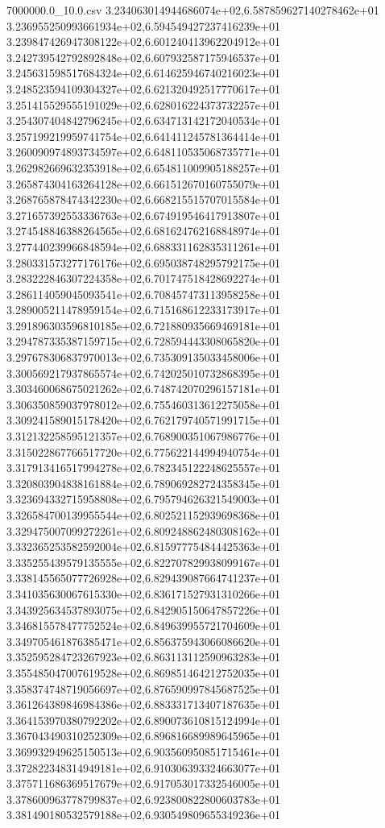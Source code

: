 \begin{filecontents*}{7000000.0_10.0.csv}
3.234063014944686074e+02,6.587859627140278462e+01
3.236955250993661934e+02,6.594549427237416239e+01
3.239847426947308122e+02,6.601240413962204912e+01
3.242739542792892848e+02,6.607932587175946537e+01
3.245631598517684324e+02,6.614625946740216023e+01
3.248523594109304327e+02,6.621320492517770617e+01
3.251415529555191029e+02,6.628016224373732257e+01
3.254307404842796245e+02,6.634713142172040534e+01
3.257199219959741754e+02,6.641411245781364414e+01
3.260090974893734597e+02,6.648110535068735771e+01
3.262982669632353918e+02,6.654811009905188257e+01
3.265874304163264128e+02,6.661512670160755079e+01
3.268765878474342230e+02,6.668215515707015584e+01
3.271657392553336763e+02,6.674919546417913807e+01
3.274548846388264565e+02,6.681624762168848974e+01
3.277440239966848594e+02,6.688331162835311261e+01
3.280331573277176176e+02,6.695038748295792175e+01
3.283222846307224358e+02,6.701747518428692274e+01
3.286114059045093541e+02,6.708457473113958258e+01
3.289005211478959154e+02,6.715168612233173917e+01
3.291896303596810185e+02,6.721880935669469181e+01
3.294787335387159715e+02,6.728594443308065820e+01
3.297678306837970013e+02,6.735309135033458006e+01
3.300569217937865574e+02,6.742025010732868395e+01
3.303460068675021262e+02,6.748742070296157181e+01
3.306350859037978012e+02,6.755460313612275058e+01
3.309241589015178420e+02,6.762179740571991715e+01
3.312132258595121357e+02,6.768900351067986776e+01
3.315022867766517720e+02,6.775622144994940754e+01
3.317913416517994278e+02,6.782345122248625557e+01
3.320803904838161884e+02,6.789069282724358345e+01
3.323694332715958808e+02,6.795794626321549003e+01
3.326584700139955544e+02,6.802521152939698368e+01
3.329475007099272261e+02,6.809248862480308162e+01
3.332365253582592004e+02,6.815977754844425363e+01
3.335255439579135555e+02,6.822707829938099167e+01
3.338145565077726928e+02,6.829439087664741237e+01
3.341035630067615330e+02,6.836171527931310266e+01
3.343925634537893075e+02,6.842905150647857226e+01
3.346815578477752524e+02,6.849639955721704609e+01
3.349705461876385471e+02,6.856375943066086620e+01
3.352595284723267923e+02,6.863113112590963283e+01
3.355485047007619528e+02,6.869851464212752035e+01
3.358374748719056697e+02,6.876590997845687525e+01
3.361264389846984386e+02,6.883331713407187635e+01
3.364153970380792202e+02,6.890073610815124994e+01
3.367043490310252309e+02,6.896816689989645965e+01
3.369932949625150513e+02,6.903560950851715461e+01
3.372822348314949181e+02,6.910306393324663077e+01
3.375711686369517679e+02,6.917053017332546005e+01
3.378600963778799837e+02,6.923800822800603783e+01
3.381490180532579188e+02,6.930549809655349236e+01

\end{filecontents*}
